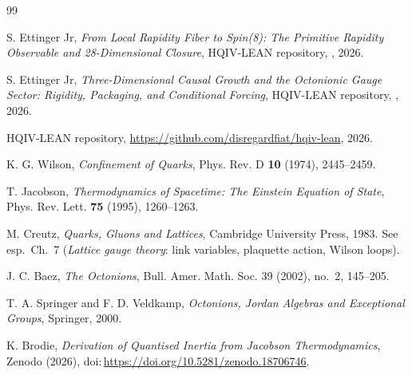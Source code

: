 \documentclass[11pt]{amsart}
\begin{document}
\begin{thebibliography}{99}

S. Ettinger Jr, \emph{From Local Rapidity Fiber to Spin(8): The Primitive Rapidity Observable and 28-Dimensional Closure}, HQIV-LEAN repository, , 2026.

S. Ettinger Jr, \emph{Three-Dimensional Causal Growth and the Octonionic Gauge Sector: Rigidity, Packaging, and Conditional Forcing}, HQIV-LEAN repository, , 2026.

HQIV-LEAN repository, \url{https://github.com/disregardfiat/hqiv-lean}, 2026.

K. G. Wilson, \emph{Confinement of Quarks}, Phys. Rev. D \textbf{10} (1974), 2445--2459.

T. Jacobson, \emph{Thermodynamics of Spacetime: The Einstein Equation of State}, Phys. Rev. Lett. \textbf{75} (1995), 1260--1263.

M. Creutz, \emph{Quarks, Gluons and Lattices}, Cambridge University Press, 1983. See esp.\ Ch.~7 (\emph{Lattice gauge theory}: link variables, plaquette action, Wilson loops).

J. C. Baez, \emph{The Octonions}, Bull. Amer. Math. Soc. 39 (2002), no.~2, 145--205.

T. A. Springer and F. D. Veldkamp, \emph{Octonions, Jordan Algebras and Exceptional Groups}, Springer, 2000.

K. Brodie, \emph{Derivation of Quantised Inertia from Jacobson Thermodynamics}, Zenodo (2026), doi:\,\url{https://doi.org/10.5281/zenodo.18706746}.

\end{thebibliography}
\end{document}
